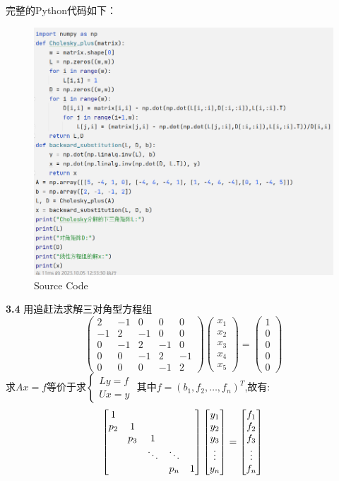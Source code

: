 \documentclass[a4paper,11pt,UTF8]{article}
\begin{document}
\noindent 完整的Python代码如下：
\begin{figure}[H] 
	\centering 
	\includegraphics[scale=0.5]{kx3.3_2.png}
	\caption{Source Code}
\end{figure}
\textbf{3.4} 用追赶法求解三对角型方程组
$$
\begin{pmatrix}2&-1&0&0&0\\-1&2&-1&0&0\\0&-1&2&-1&0\\0&0&-1&2&-1\\0&0&0&-1&2\end{pmatrix}\begin{pmatrix}x_1\\x_2\\x_3\\x_4\\x_5\end{pmatrix}=\begin{pmatrix}1\\0\\0\\0\\0\end{pmatrix}
$$
求$Ax=f$等价于求$\begin{cases}Ly=f\\Ux=y\end{cases}$ 其中$f=\left(b_{1},f_{2},\ldots,f_{n}\right)^{T}$,故有:
$$
\begin{bmatrix}1&&&&\\p_2&1&&&\\&p_3&1&&\\&&\ddots&\ddots&\\&&&p_n&1\end{bmatrix}\begin{bmatrix}y_1\\y_2\\y_3\\\vdots\\y_n\end{bmatrix}=\begin{bmatrix}f_1\\f_2\\f_3\\\vdots\\f_n\end{bmatrix} \\
$$
\end{document}
